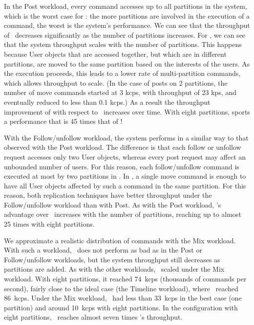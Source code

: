In the Post workload, every command accesses up to all partitions in the system,
which is the worst case for \ssmr{}: the more partitions are involved in the
execution of a command, the worst is the system's performance. We can see that
the throughput of \ssmr\ decreases significantly as the number of partitions
increases. For \dssmr{}, we can see that the system throughput scales with the
number of partitions. This happens because User objects that are accessed
together, but which are in different partitions, are moved to the same partition
based on the interests of the users. As the execution proceeds, this leads to a
lower rate of multi-partition commands, which allows throughput to scale. (In
the case of posts on 2 partitions, the number of move commands started at 3
kcps, with throughput of 23 kps, and eventually reduced to less than 0.1 kcps.)
As a result the throughput improvement of \dssmr{} with respect to \ssmr\
increases over time. With eight partitions, \dssmr{} sports a performance that
is 45 times that of \ssmr!

With the Follow/unfollow workload, the system performs in a similar way to that
observed with the Post workload. The difference is that each follow or unfollow
request accesses only two User objects, whereas every post request may affect an
unbounded number of users. For this reason, each follow/unfollow command is
executed at most by two partitions in \ssmr{}. In \dssmr{}, a single move
command is enough to have all User objects affected by such a command in the
same partition. For this reason, both replication techniques have better
throughput under the Follow/unfollow workload than with Post. As with the Post
workload, \dssmr{}'s advantage over \ssmr\ increases with the number of
partitions, reaching up to almost 25 times with eight partitions.

We approximate a realistic distribution of commands with the Mix workload. With
such a workload, \ssmr\ does not perform as bad as in the Post or
Follow/unfollow workloads, but the system throughput still decreases as
partitions are added. As with the other workloads, \dssmr\ scaled under the Mix
workload. With eight partitions, it reached 74~kcps (thousands of commands per
second), fairly close to the ideal case (the Timeline workload), where \dssmr\
reached 86~kcps. Under the Mix workload, \ssmr\ had less than 33~kcps in the
best case (one partition) and around 10~kcps with eight partitions. In the
configuration with eight partitions, \dssmr\ reaches almost seven times \ssmr's
throughput.

